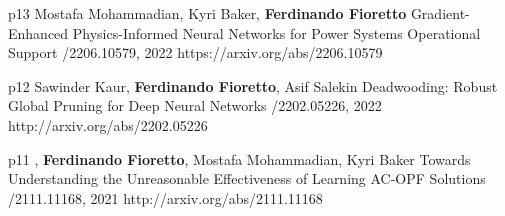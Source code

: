 \begin{pubs}
\wsentry
	{p13}%
	{Mostafa Mohammadian, Kyri Baker, {\bf Ferdinando Fioretto}}
	{Gradient-Enhanced Physics-Informed Neural Networks for Power Systems Operational Support}
	{/2206.10579, 2022}
	{https://arxiv.org/abs/2206.10579}





\wsentry 
	{p12}%
	{Sawinder Kaur, {\bf Ferdinando Fioretto}, Asif Salekin}
	{Deadwooding: Robust Global Pruning for Deep Neural Networks} 
	{/2202.05226, 2022}
	{http://arxiv.org/abs/2202.05226}

\wsentry 
	{p11}%
	{, {\bf Ferdinando Fioretto}, Mostafa Mohammadian, Kyri Baker}
	{Towards Understanding the Unreasonable Effectiveness of Learning AC-OPF Solutions}
	{/2111.11168, 2021}
	{http://arxiv.org/abs/2111.11168}




\end{pubs}
